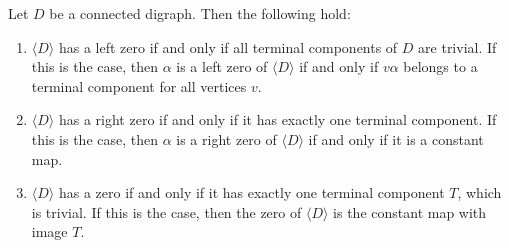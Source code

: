 \documentclass[ALCO,ThmDefs,Unicode,epreuves]{cedram}
\newcommand{\genset}[1]{\langle#1\rangle}
\begin{document}
\begin{proposition} \label{prop:zero}
 Let $D$ be a connected digraph. Then the following hold:
 \begin{enumerate}[(\roman*)]

 \item
 \label{it:left-0} $\genset{D}$ has a left zero if and only if all
 terminal components of $D$ are trivial. If this is the case, then
 $\alpha$ is a left zero of $\genset{D}$ if and only if $v \alpha$ belongs
 to a terminal component for all vertices $v$.

 \item
 \label{it:right-0} $\genset{D}$ has a right zero if and only if it has
 exactly one terminal component. If this is the case, then $\alpha$ is a
 right zero of $\genset{D}$ if and only if it is a constant map.

 \item
 \label{it:0} $\genset{D}$ has a zero if and only if it has exactly one
 terminal component $T$, which is trivial. If this is the case, then the
 zero of $\genset{D}$ is the constant map with image $T$.
 \end{enumerate}
\end{proposition}
\end{document}
